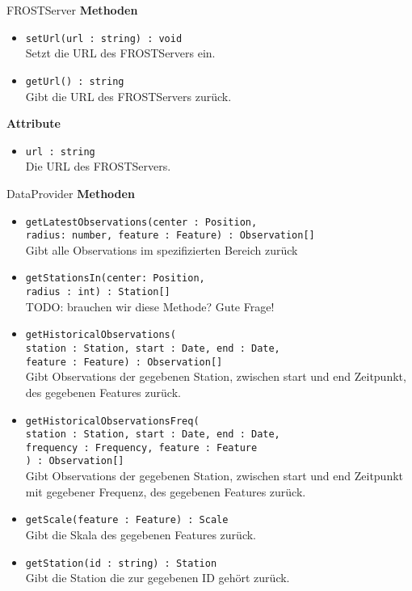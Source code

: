 \begin{Class}{FROSTServer}
    \textbf{Methoden}
    \begin{itemize}
        \item \texttt{setUrl(url : string) : void}
        \\Setzt die URL des FROSTServers ein.
        \item \texttt{getUrl() : string}
        \\Gibt die URL des FROSTServers zurück.
    \end{itemize}
    
    \textbf{Attribute}
    \begin{itemize}
        \item \texttt{url : string}
        \\Die URL des FROSTServers.
    \end{itemize}
\end{Class}

\begin{Class}{DataProvider}
    \textbf{Methoden}
    \begin{itemize}
        \item \texttt{getLatestObservations(center : Position,
        \\radius: number, feature : Feature) : Observation[]}
        \\Gibt alle Observations im spezifizierten Bereich zurück
        \item \texttt{getStationsIn(center: Position,
        \\radius : int) : Station[]}
        \\TODO: brauchen wir diese Methode? Gute Frage!
        \item \texttt{getHistoricalObservations(
            \\station : Station, start : Date, end : Date,
            \\feature : Feature) : Observation[]}
        \\Gibt Observations der gegebenen Station, zwischen start und end Zeitpunkt, des gegebenen Features zurück.
        \item \texttt{getHistoricalObservationsFreq(
            \\station : Station, start : Date, end : Date,
            \\frequency : Frequency, feature : Feature
            \\) : Observation[]}
        \\Gibt Observations der gegebenen Station, zwischen start und end Zeitpunkt mit gegebener Frequenz, des gegebenen Features zurück.
        \item \texttt{getScale(feature : Feature) : Scale}
        \\Gibt die Skala des gegebenen Features zurück.
        \item \texttt{getStation(id : string) : Station}
        \\Gibt die Station die zur gegebenen ID gehört zurück.
    \end{itemize}
\end{Class}

